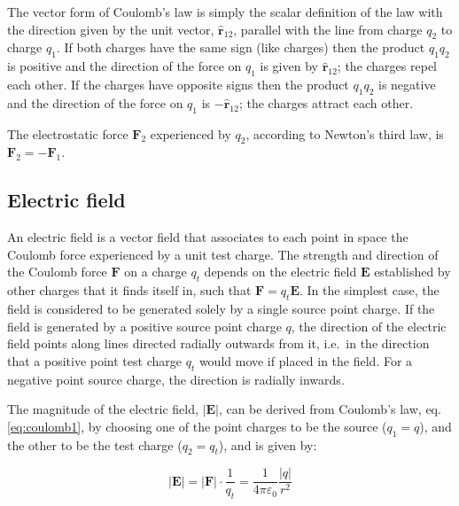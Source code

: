 \documentclass[
  9pt,
]{extbook}
\theoremstyle{definition}
\theoremstyle{definition}
\theoremstyle{definition}
\theoremstyle{remark}
\begin{document}
The vector form of Coulomb's law is simply the scalar definition of the law with the direction given by the unit vector, \({\textstyle {\widehat {\mathbf {r} }}_{12}}\), parallel with the line from charge \(q_{2}\) to charge \(q_{1}\). If both charges have the same sign (like charges) then the product \(q_1q_2\) is positive and the direction of the force on \(q_{1}\) is given by \({\textstyle {\widehat {\mathbf {r} }}_{12}}\); the charges repel each other. If the charges have opposite signs then the product \(q_1q_2\) is negative and the direction of the force on \(q_{1}\) is \({\textstyle -{\hat {\mathbf {r} }}_{12}}\); the charges attract each other.

The electrostatic force \({\textstyle \mathbf {F} _{2}}\) experienced by \(q_{2}\), according to Newton's third law, is \({\textstyle \mathbf {F} _{2}=-\mathbf {F} _{1}}\).

\hypertarget{electric-field}{%
\subsection{Electric field}\label{electric-field}}

An electric field is a vector field that associates to each point in space the Coulomb force experienced by a unit test charge. The strength and direction of the Coulomb force \({\textstyle \mathbf {F} }\) on a charge
\({\textstyle q_{t}}\) depends on the electric field \({\textstyle \mathbf {E} }\) established by other charges that it finds itself in, such that
\({\textstyle \mathbf {F} =q_{t}\mathbf {E} }\). In the simplest case, the field is considered to be generated solely by a single source point charge. If the field is generated by a positive source point charge \({\textstyle q}\), the direction of the electric field points along lines directed radially outwards from it, i.e.~in the direction that a positive point test charge \({\textstyle q_{t}}\) would move if placed in the field. For a negative point source charge, the direction is radially inwards.

The magnitude of the electric field, \(|\mathbf{E}|\), can be derived from Coulomb's law, eq. \eqref{eq:coulomb1}, by choosing one of the point charges to be the source (\(q_1=q\)), and the other to be the test charge (\(q_2=q_t\)), and is given by:

\begin{equation}
{\displaystyle |\mathbf {E} |=|\mathbf{F}|\cdot \frac{1}{q_t}=\frac{1}{4\pi\varepsilon_0}{\frac {|q|}{r^{2}}}}
\label{eq:coulomb3}
\end{equation}
\end{document}
